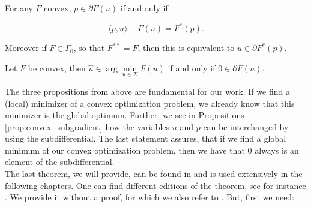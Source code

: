     \begin{proposition} %
    \label{prop:convex_subgradient}
        
        For any $F$ convex, $p \in \partial F(u)$ if and only if

            $$
                \langle p, u \rangle - F(u) = F^{\ast}(p).
            $$

        Moreover if $F \in \Gamma_{0}$, so that $F^{\ast\ast} = F$, then this is equivalent to $u \in \partial F^{\ast}(p)$.

    \end{proposition}

    \begin{proposition} %
    \label{prop:zero_element_of_subgradient}
        
        Let $F$ be convex, then $\hat{u} \in \arg \min\limits_{u \in X} F(u)$ if and only if $0 \in \partial F(\hat{u})$.

    \end{proposition}

    The three propositions from above are fundamental for our work. If we find a (local) minimizer of a convex optimization problem, we already know that this minimizer is the global optimum. Further, we see in Propositions \ref{prop:convex_subgradient} how the variables $u$ and $p$ can be interchanged by using the subdifferential. The last statement assures, that if we find a global minimum of our convex optimization problem, then we have that $0$ always is an element of the subdifferential.\\ 
    The last theorem, we will provide, can be found in \cite{Rockafellar} and is used extensively in the following chapters. One can find different editions of the theorem, see for instance \cite{Yao-Liang-Yu}. We provide it without a proof, for which we also refer to \cite{Rockafellar}. But, first we need:

